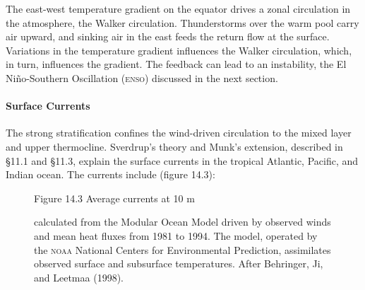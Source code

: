 The east-west temperature gradient on the equator drives a zonal
circulation in the atmosphere, the Walker circulation. Thunderstorms
over the warm pool carry air upward, and sinking air in the east feeds
the return flow at the surface. Variations in the temperature gradient
influences the Walker circulation, which, in turn, influences the
gradient. The feedback can lead to an instability, the El
Ni\~{n}o-Southern Oscillation (\textsc{enso}) discussed in the next section.

\paragraph{Surface Currents}
The strong
stratification confines the wind-driven circulation to the mixed
layer and upper
thermocline. Sverdrup's theory and Munk's
extension, described in \S11.1 and \S11.3, explain the surface
currents in the tropical Atlantic, Pacific, and Indian ocean. The
currents include (figure 14.3):

\begin{figure}[t!]
\footnotesize
Figure 14.3 Average currents at 10 m \rule{0pt}{3ex}calculated from
the Modular Ocean Model driven by observed winds and mean heat
fluxes from 1981 to 1994. The model, operated by the
\textsc{noaa} National Centers for Environmental Prediction,
assimilates observed surface and subsurface temperatures. After
Behringer, Ji, and Leetmaa (1998).
\label{fig:EqCurr}
\vspace{-4ex}
\end{figure}

